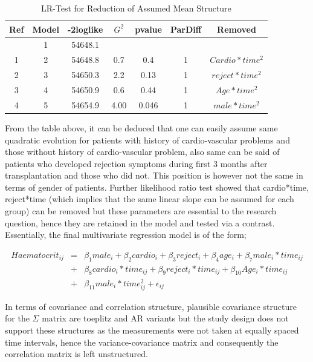 \documentclass[11pt]{article}
\begin{document}
\begin{table}[H]
\centering
\begin{tabular}{ccccccc}
\hline
Ref & Model & -2loglike & $G^2$ & pvalue & ParDiff & Removed\\
\hline
 & 1 & 54648.1 &  & & \\
1 & 2 & 54648.8 & 0.7 & 0.4 & 1 & $Cardio*time^2$\\
2 & 3 & 54650.3 & 2.2 & 0.13 & 1 & $reject*time^2$\\
3 & 4 & 54650.9 & 0.6 & 0.44 & 1 & $Age*time^2$\\
4 & 5 & 54654.9 & 4.00 & 0.046 & 1 & $male*time^2$\\
\hline
\end{tabular}
\caption{LR-Test for Reduction of Assumed Mean Structure}
\end{table}

From the table above, it can be deduced that one can easily assume same quadratic evolution for patients with history of cardio-vascular problems and those without history of cardio-vascular problem, also same can be said of patients who developed rejection symptoms during first 3 months after transplantation and those who did not. This position is however not the same in terms of gender of patients. Further likelihood ratio test showed that cardio*time, reject*time (which implies that the same linear slope can be assumed for each group) can be removed but these parameters are essential to the research question, hence they are retained in the model and tested via a contrast. Essentially, the final multivariate regression model is of the form;

\begin{eqnarray*}
Haematocrit_{ij} &=& \beta_{1}male_{i} + \beta_{2}cardio_{i} + \beta_{3}reject_{i} + \beta_{4}age_{i} + \beta_{7}male_{i}*time_{ij} \\
&+& \beta_{8}cardio_{i}*time_{ij} + \beta_{9}reject_{i}*time_{ij} + \beta_{10}Age_{i}*time_{ij} \\
&+& \beta_{11}male_{i}*time_{ij}^2 + \epsilon_{ij}
\end{eqnarray*}

In terms of covariance and correlation structure, plausible covariance structure for the $\Sigma$ matrix are toeplitz and AR variants but the study design does not support these structures as the measurements were not taken at equally spaced time intervals, hence the variance-covariance matrix and consequently the correlation matrix is left unstructured.
\end{document}
